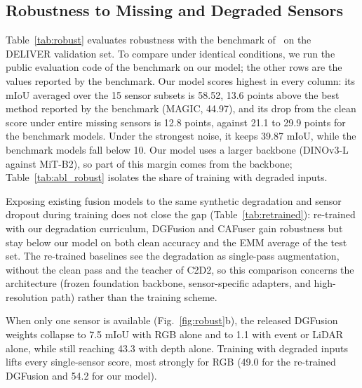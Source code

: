 \subsection{Robustness to Missing and Degraded Sensors}
Table~\ref{tab:robust} evaluates robustness with the benchmark of~\cite{mmssbench2025} on the DELIVER validation set. To compare under identical conditions, we run the public evaluation code of the benchmark on our model; the other rows are the values reported by the benchmark. Our model scores highest in every column: its mIoU averaged over the 15 sensor subsets is 58.52, 13.6 points above the best method reported by the benchmark (MAGIC, 44.97), and its drop from the clean score under entire missing sensors is 12.8 points, against 21.1 to 29.9 points for the benchmark models. Under the strongest noise, it keeps 39.87 mIoU, while the benchmark models fall below 10. Our model uses a larger backbone (DINOv3-L against MiT-B2), so part of this margin comes from the backbone; Table~\ref{tab:abl_robust} isolates the share of training with degraded inputs.

Exposing existing fusion models to the same synthetic degradation and sensor dropout during training does not close the gap (Table~\ref{tab:retrained}): re-trained with our degradation curriculum, DGFusion and CAFuser gain robustness but stay below our model on both clean accuracy and the EMM average of the test set. The re-trained baselines see the degradation as single-pass augmentation, without the clean pass and the teacher of C2D2, so this comparison concerns the architecture (frozen foundation backbone, sensor-specific adapters, and high-resolution path) rather than the training scheme.

When only one sensor is available (Fig.~\ref{fig:robust}b), the released DGFusion weights collapse to 7.5 mIoU with RGB alone and to 1.1 with event or LiDAR alone, while still reaching 43.3 with depth alone. Training with degraded inputs lifts every single-sensor score, most strongly for RGB (49.0 for the re-trained DGFusion and 54.2 for our model).

